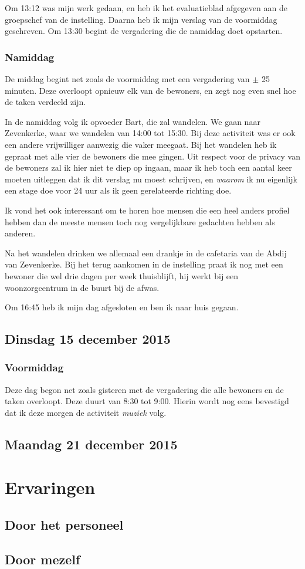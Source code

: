\documentclass[a4paper,12pt]{article}
\begin{document}
Om 13:12 was mijn werk gedaan, en heb ik het evaluatieblad afgegeven aan de groepschef van de instelling. Daarna heb ik mijn verslag van de voormiddag geschreven. Om 13:30 begint de vergadering die de namiddag doet opstarten.

\subsubsection{Namiddag}

De middag begint net zoals de voormiddag met een vergadering van $\pm$ 25 minuten. Deze overloopt opnieuw elk van de bewoners, en zegt nog even snel hoe de taken verdeeld zijn.

In de namiddag volg ik opvoeder Bart, die zal wandelen. We gaan naar Zevenkerke, waar we wandelen van 14:00 tot 15:30. Bij deze activiteit was er ook een andere vrijwilliger aanwezig die vaker meegaat. Bij het wandelen heb ik gepraat met alle vier de bewoners die mee gingen. Uit respect voor de privacy van de bewoners zal ik hier niet te diep op ingaan, maar ik heb toch een aantal keer moeten uitleggen dat ik dit verslag nu moest schrijven, en \emph{waarom} ik nu eigenlijk een stage doe voor 24 uur als ik geen gerelateerde richting doe.

Ik vond het ook interessant om te horen hoe mensen die een heel anders profiel hebben dan de meeste mensen toch nog vergelijkbare gedachten hebben als anderen.

Na het wandelen drinken we allemaal een drankje in de cafetaria van de Abdij van Zevenkerke. Bij het terug aankomen in de instelling praat ik nog met een bewoner die wel drie dagen per week thuisblijft, hij werkt bij een woonzorgcentrum in de buurt bij de afwas.

Om 16:45 heb ik mijn dag afgesloten en ben ik naar huis gegaan.

\subsection{Dinsdag 15 december 2015}

\subsubsection{Voormiddag}

Deze dag begon net zoals gisteren met de vergadering die alle bewoners en de taken overloopt. Deze duurt van 8:30 tot 9:00. Hierin wordt nog eens bevestigd dat ik deze morgen de activiteit \emph{muziek} volg.

\subsection{Maandag 21 december 2015}

\section{Ervaringen}

\subsection{Door het personeel}

\subsection{Door mezelf}
\end{document}
